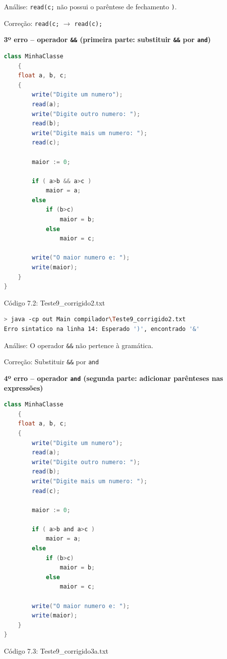 \documentclass[12pt,a4paper]{article}
\begin{document}
Análise: \texttt{read(c;} não possui o parêntese de fechamento \texttt{)}.

Correção: \texttt{read(c;} $\to$ \texttt{read(c);}

\textbf{3º erro -- operador \texttt{\&\&} (primeira parte: substituir \texttt{\&\&} por \texttt{and})}

\begin{lstlisting}[language=Java]
class MinhaClasse
    {
    float a, b, c;
    {
        write("Digite um numero");
        read(a);
        write("Digite outro numero: ");
        read(b);
        write("Digite mais um numero: ");
        read(c);

        maior := 0;

        if ( a>b && a>c )
            maior = a;
        else
            if (b>c)
                maior = b;
            else
                maior = c;

        write("O maior numero e: ");
        write(maior);
    }
}
\end{lstlisting}

Código 7.2: Teste9\_corrigido2.txt

\begin{lstlisting}[language=bash]
> java -cp out Main compilador\Teste9_corrigido2.txt
Erro sintatico na linha 14: Esperado ')', encontrado '&'
\end{lstlisting}

Análise: O operador \texttt{\&\&} não pertence à gramática.

Correção: Substituir \texttt{\&\&} por \texttt{and}

\textbf{4º erro -- operador \texttt{and} (segunda parte: adicionar parênteses nas expressões)}

\begin{lstlisting}[language=Java]
class MinhaClasse
    {
    float a, b, c;
    {
        write("Digite um numero");
        read(a);
        write("Digite outro numero: ");
        read(b);
        write("Digite mais um numero: ");
        read(c);

        maior := 0;

        if ( a>b and a>c )
            maior = a;
        else
            if (b>c)
                maior = b;
            else
                maior = c;

        write("O maior numero e: ");
        write(maior);
    }
}
\end{lstlisting}

Código 7.3: Teste9\_corrigido3a.txt
\end{document}
